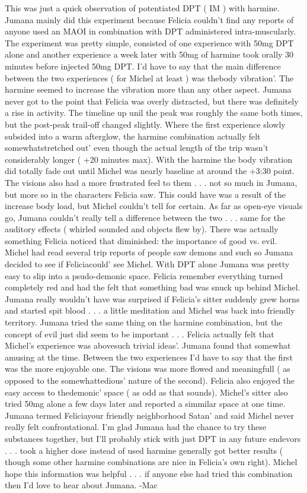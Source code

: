 \documentclass[12pt]{book}
\begin{document}
This was just a quick observation of potentiated DPT ( IM ) with harmine. Jumana mainly did this experiment because Felicia couldn't find any reports of anyone used an MAOI in combination with DPT administered intra-muscularly. The experiment was pretty simple, consisted of one experience with 50mg DPT alone and another experience a week later with 50mg of harmine took orally 30 minutes before injected 50mg DPT. I'd have to say that the main difference between the two experiences ( for Michel at least ) was thebody vibration'. The harmine seemed to increase the vibration more than any other aspect. Jumana never got to the point that Felicia was overly distracted, but there was definitely a rise in activity. The timeline up unil the peak was roughly the same both times, but the post-peak trail-off changed slightly. Where the first experience slowly subsided into a warm afterglow, the harmine combination actually felt somewhatstretched out' even though the actual length of the trip wasn't considerably longer ( +20 minutes max). With the harmine the body vibration did totally fade out until Michel was nearly baseline at around the +3:30 point. The visions also had a more frustrated feel to them . . .  not so much in Jumana, but more so in the characters Felicia saw. This could have was a result of the increase body load, but Michel couldn't tell for certain. As far as open-eye visuals go, Jumana couldn't really tell a difference between the two . . .  same for the auditory effects ( whirled sounded and objects flew by). There was actually something Felicia noticed that diminished: the importance of good vs. evil. Michel had read several trip reports of people saw demons and such so Jumana decided to see if Feliciacould' see Michel. With DPT alone Jumana was pretty easy to slip into a psudo-demonic space. Felicia remember everything turned completely red and had the felt that something bad was snuck up behind Michel. Jumana really wouldn't have was surprised if Felicia's sitter suddenly grew horns and started spit blood . . .  a little meditation and Michel was back into friendly territory. Jumana tried the same thing on the harmine combination, but the concept of evil just did seem to be important . . .  Felicia actually felt that Michel's experience was abovesuch trivial ideas'. Jumana found that somewhat amusing at the time. Between the two experiences I'd have to say that the first was the more enjoyable one. The visions was more flowed and meaningfull ( as opposed to the somewhattedious' nature of the second). Felicia also enjoyed the easy access to thedemonic' space ( as odd as that sounds). Michel's sitter also tried 50mg alone a few days later and reported a simmilar space at one time. Jumana termed Feliciayour friendly neighborhood Satan' and said Michel never really felt confrontational. I'm glad Jumana had the chance to try these substances together, but I'll probably stick with just DPT in any future endevors . . .  took a higher dose instead of used harmine generally got better results ( though some other harmine combinations are nice in Felicia's own right). Michel hope this information was helpful . . .  if anyone else had tried this combination then I'd love to hear about Jumana. -Mac
\end{document}
